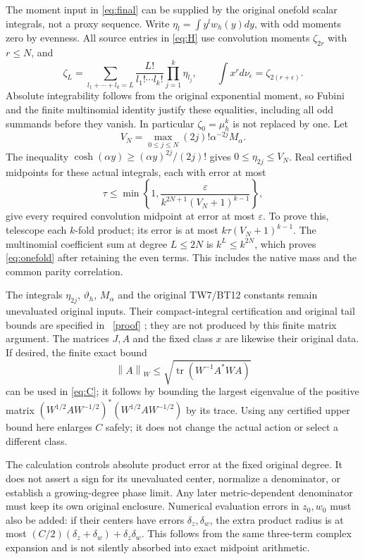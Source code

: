 \documentclass[11pt]{article}
\newcommand{\tr}{\operatorname{tr}}
\newcommand{\norm}[1]{\left\lVert#1\right\rVert}
\begin{document}
The moment input in \eqref{eq:final} can be supplied by the
original onefold scalar integrals, not a proxy sequence. Write
$\eta_l=\int y^lw_h(y)dy$, with odd moments zero by evenness.
All source entries in \eqref{eq:H} use convolution moments
$\zeta_{2r}$ with $r\le N$, and
\[
 \zeta_L=\sum_{l_1+\cdots+l_k=L}
             \frac{L!}{l_1!\cdots l_k!}\prod_{j=1}^k\eta_{l_j},
 \qquad \int x^r d\nu_\epsilon=\zeta_{2(r+\epsilon)}.
\]
Absolute integrability follows from the original exponential
moment, so Fubini and the finite multinomial identity justify
these equalities, including all odd summands before they vanish.
In particular $\zeta_0=\mu_h^k$ is not replaced by one.
Let
\[
 V_N=\max_{0\le j\le N}(2j)!\alpha^{-2j}M_\alpha.
\]
The inequality $\cosh(\alpha y)\ge(\alpha y)^{2j}/(2j)!$
gives $0\le\eta_{2j}\le V_N$. Real certified midpoints for
these actual integrals, each with error at most
\begin{equation}\tag{MC16}\label{eq:onefold}
 \tau\le\min\left\{1,
         \frac{\varepsilon}{k^{2N+1}(V_N+1)^{k-1}}\right\},
\end{equation}
give every required convolution midpoint at error at most
$\varepsilon$. To prove this, telescope each $k$-fold product;
its error is at most $k\tau(V_N+1)^{k-1}$. The multinomial
coefficient sum at degree $L\le2N$ is $k^L\le k^{2N}$,
which proves \eqref{eq:onefold} after retaining the even terms.
This includes the native mass and the common parity correlation.

The integrals $\eta_{2j}$, $\vartheta_h$, $M_\alpha$ and the
original TW7/BT12 constants remain unevaluated original inputs.
Their compact-integral certification and original tail bounds
are specified in \cite{NP}%
~\href{https://github.com/KokunoYumeto/zeta-function-research-reader/blob/5992ad50c0f2a06921f1fcaded7b4e38097c0739/workbenches/splitzero-tandem/continuations/20260920-original-kernel-mixed-determinants/providers/NATIVE_MOMENT_PRECISION.tex\#L1}{[proof]}%
{}; they are not produced by this finite
matrix argument. The matrices $J,A$ and the fixed class $x$ are
likewise their original data. If desired, the finite exact bound
\[
 \norm{A}_W\le\sqrt{\tr(W^{-1}A^*WA)}
\]
can be used in \eqref{eq:C}; it follows by bounding the largest
eigenvalue of the positive matrix
$(W^{1/2}AW^{-1/2})^*(W^{1/2}AW^{-1/2})$ by its trace.
Using any certified upper bound here enlarges $C$ safely; it does
not change the actual action or select a different class.

The calculation controls absolute product error at the fixed
original degree. It does not assert a sign for its unevaluated
center, normalize a denominator, or establish a growing-degree
phase limit. Any later metric-dependent denominator must keep its
own original enclosure. Numerical evaluation errors in $z_0,w_0$
must also be added: if their centers have errors $\delta_z,
\delta_w$, the extra product radius is at most
$(C/2)(\delta_z+\delta_w)+\delta_z\delta_w$. This follows
from the same three-term complex expansion and is not silently
absorbed into exact midpoint arithmetic.
\end{document}
